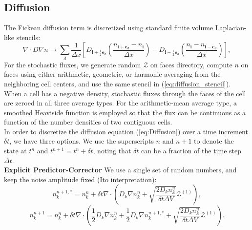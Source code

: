 \documentclass[final]{siamltex}
\newcommand{\ib}{\mathbf{i}}
\newcommand{\eb}{\mathbf{e}}
\def\mZb {\bm{\mathcal{Z}}}
\def\half   {\frac{1}{2}}
\begin{document}
\subsection{Diffusion}
The Fickean diffusion term is discretized using standard finite volume
Laplacian-like stencils:
\begin{equation}
\nabla\cdot D\nabla n \rightarrow \sum_d \frac{1}{\Delta x}\left[D_{\ib+\half\eb_d}\left(\frac{n_{\ib + \eb_d}-n_{\ib}}{\Delta x}\right) - D_{\ib-\half\eb_d}\left(\frac{n_{\ib}-n_{\ib-\eb_d}}{\Delta x}\right)\right],\label{eq:diffusion_stencil}
\end{equation}
For the stochastic fluxes,
we generate random $\mZb$ on faces directory, compute $n$ on faces
using either arithmetic, geometric, or harmonic averaging from the 
neighboring cell centers, and use the same stencil 
in (\ref{eq:diffusion_stencil}).
When a cell has a negative density, stochastic fluxes through the faces of the cell are zeroed in all three average types.
For the arithmetic-mean average type, a smoothed Heaviside function is employed so that the flux can be continuous as a function of the number densities of two contiguous cells. 
\\

In order to discretize the diffusion equation (\ref{eq:Diffusion}) over a time 
increment $\delta t$, we have three options.  We use the superscripts $n$
and $n+1$ to denote the state at $t^n$ and $t^{n+1}=t^n+\delta t$, noting
that $\delta t$ can be a fraction of the time step $\Delta t$.\\

{\bf Explicit Predictor-Corrector}
We use a single set of random numbers, and keep the noise amplitude
fixed (Ito interpretation):
\begin{equation}
n_k^{n+1,*} = n_k^n + \delta t \nabla\cdot\left(D_k \nabla n_k^n
+ \sqrt{\frac{2 D_k n_k^n}{\delta t\Delta V}}\mZb^{(1)}\right),
\end{equation}
\begin{equation}
n_k^{n+1} = n_k^n + \delta t\nabla\cdot\left(
\half D_k\nabla n_k^n + \half D_k\nabla n_k^{n+1,*}
+ \sqrt{\frac{2 D_k n_k^n}{\delta t\Delta V}}\mZb^{(1)}
\right).
\end{equation}
\end{document}
